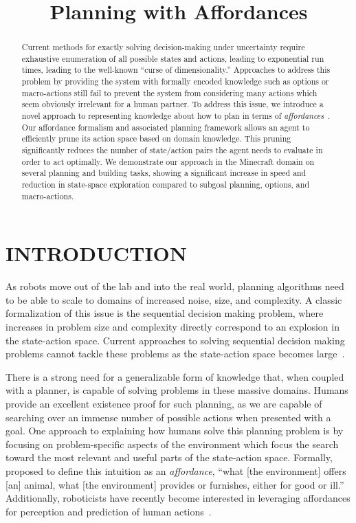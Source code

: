 \documentclass[]{article}
\title{Planning with Affordances}
\begin{document}
\author{}
\maketitle

\begin{abstract}
Current methods for exactly solving decision-making under uncertainty
require exhaustive enumeration of all possible states and actions,
leading to exponential run times, leading to the well-known ``curse of
dimensionality.''  Approaches to address this problem by providing the
system with formally encoded knowledge such as options or
macro-actions still fail to prevent the system from considering many
actions which seem obviously irrelevant for a human partner.  To
address this issue, we introduce a novel approach to representing
knowledge about how to plan in terms of {\em
  affordances}~\citep{gibson77}.  Our affordance formalism and
associated planning framework allows an agent to efficiently prune its
action space based on domain knowledge.  This pruning significantly
reduces the number of state/action pairs the agent needs to evaluate
in order to act optimally.  We demonstrate our approach in the
Minecraft domain on several planning and building tasks, showing a
significant increase in speed and reduction in state-space exploration
compared to subgoal planning, options, and macro-actions.
\end{abstract}

\section{INTRODUCTION}

As robots move out of the lab and into the real world, planning
algorithms need to be able to scale to domains of increased noise,
size, and complexity.  A classic formalization of this issue is the
sequential decision making problem, where increases in problem size
and complexity directly correspond to an explosion in the state-action
space. Current approaches to solving sequential decision making
problems cannot tackle these problems as the state-action space
becomes large~\citep{grounds05}.

There is a strong need for a generalizable form of knowledge that,
when coupled with a planner, is capable of solving problems in these
massive domains. Humans provide an excellent existence proof for such
planning, as we are capable of searching over an immense number of
possible actions when presented with a goal.  One approach to
explaining how humans solve this planning problem is by focusing on
problem-specific aspects of the environment which focus the search
toward the most relevant and useful parts of the state-action space.
Formally, \citet{gibson77} proposed to define this intuition as an
{\em affordance}, ``what [the environment] offers [an] animal, what
[the environment] provides or furnishes, either for good or ill.''
Additionally, roboticists have recently become interested in
leveraging affordances for perception and prediction of
human actions~\citep{koppula13a, koppula13b}.
\end{document}
